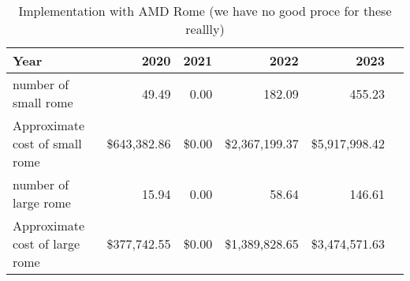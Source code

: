 \tiny \begin{longtable} { |p{}  |r  |r  |r  |r  |r |} 
\caption{Implementation with AMD Rome (we have no good proce for these reallly) \label{tab:Rome}}\\ 
\hline 
\textbf{Year}&\textbf{2020}&\textbf{2021}&\textbf{2022}&\textbf{2023} \\ \hline
{number of small rome }&{49.49}&{0.00}&{182.09}&{455.23} \\ \hline
{Approximate cost of small rome }&{\$643,382.86}&{\$0.00}&{\$2,367,199.37}&{\$5,917,998.42} \\ \hline
{number of large rome }&{15.94}&{0.00}&{58.64}&{146.61} \\ \hline
{Approximate cost of large rome }&{\$377,742.55}&{\$0.00}&{\$1,389,828.65}&{\$3,474,571.63} \\ \hline
\end{longtable} \normalsize
